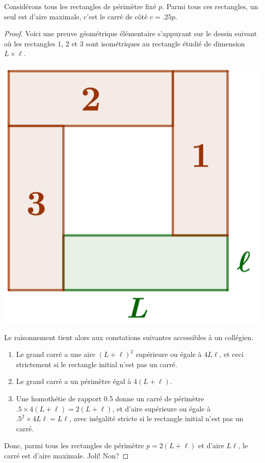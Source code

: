 \begin{fact} \label{iso-rect}
	Considérons tous les rectangles de périmètre fixé $p$. Parmi tous ces rectangles, un seul est d'aire maximale, c'est le carré de côté $c = \num{.25} p$.
\end{fact}


\begin{proof}
	Voici une preuve géométrique élémentaire s'appuyant sur le dessin suivant où les rectangles $1$, $2$ et $3$ sont isométriques au rectangle étudié de dimension $L \times \ell$.

	\begin{center}
		\includegraphics[scale=.4]{content/rectangle/rect-2-square.png}
	\end{center}
	
	Le raisonnement tient alors aux constations suivantes accessibles à un collégien.
	\begin{enumerate}
		\item Le grand carré a une aire $(L + \ell)^2$ supérieure ou égale à $4 L \ell$, et ceci strictement si le rectangle initial n'est pas un carré.

		\item Le grand carré a un périmètre égal à $4 (L + \ell)$.

		\item Une homothétie de rapport \num{.5} donne un carré 
		de périmètre $\num{.5} \times 4 (L + \ell) = 2 (L + \ell)$,
		et d'aire supérieure ou égale à $\num{.5}^2 \times 4 L \ell =  L \ell$, avec inégalité stricte si le rectangle initial n'est pas un carré.
	\end{enumerate}
	
	Donc, parmi tous les rectangles de périmètre $p = 2 (L + \ell)$ et d'aire $L \ell$, le carré est d'aire maximale. Joli! Non?
\end{proof}



